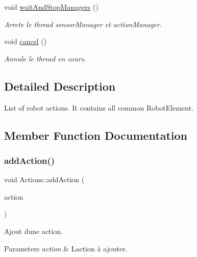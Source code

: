 \begin{DoxyCompactItemize}
\mbox{\label{classActions_a2dca3495645f189f728586d4157c699c}} 
void \hyperlink{classActions_a2dca3495645f189f728586d4157c699c}{wait\+And\+Stop\+Managers} ()
\begin{DoxyCompactList}\small\item\em Arrete le thread sensor\+Manager et action\+Manager. \end{DoxyCompactList}\item 
\mbox{\label{classActions_aa0181cb9c1642b42dca16faa8c9356e0}} 
void \hyperlink{classActions_aa0181cb9c1642b42dca16faa8c9356e0}{cancel} ()
\begin{DoxyCompactList}\small\item\em Annule le thread en cours. \end{DoxyCompactList}\end{DoxyCompactItemize}


\subsection{Detailed Description}
List of robot actions. It contains all common Robot\+Element. 

\subsection{Member Function Documentation}
\mbox{\label{classActions_a710f952f5942e626d73e47733a8848b0}} 
\subsubsection{\texorpdfstring{add\+Action()}{addAction()}}
{\footnotesize\ttfamily void Actions\+::add\+Action (\begin{DoxyParamCaption}\item[{\hyperlink{classIAction}{I\+Action} $\ast$}]{action }\end{DoxyParamCaption})\hspace{0.3cm}{\ttfamily [inline]}}



Ajout d\textquotesingle{}une action. 


\begin{DoxyParams}{Parameters}
{\em action} & L\textquotesingle{}action à ajouter. \\
\hline
\end{DoxyParams}
\mbox{\label{classActions_adf0dec391b032c0b36b329a3f039001e}} 
